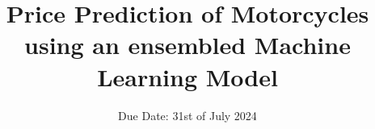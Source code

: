 

\title{\textbf{Price Prediction of Motorcycles using an ensembled Machine Learning Model}}

\date{%
  Due Date: 31st of July 2024
}
\usepackage[cc]{titlepic}





\DeclareSIUnit\eVperc{\eV\per\clight}
\DeclareSIUnit{}

\maketitle
\thispagestyle{empty}
\tableofcontents
\newpage






\printbibliography{}

\appendix
\newpage



